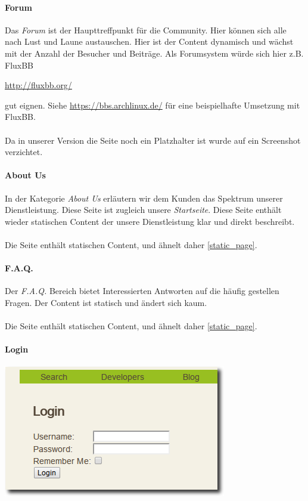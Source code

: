 \paragraph{Forum}
Das \emph{Forum} ist der Haupttreffpunkt für die Community. Hier können sich
alle nach Lust und Laune austauschen. Hier ist der Content dynamisch und wächst
mit der Anzahl der Besucher und Beiträge. Als Forumsystem würde sich hier
z.B. FluxBB 
\begin{center}
    \url{http://fluxbb.org/}
\end{center}
gut eignen. Siehe \url{https://bbs.archlinux.de/} für eine beispielhafte
Umsetzung mit FluxBB.
\\
\\
Da in unserer Version die Seite noch ein Platzhalter ist wurde auf ein Screenshot
verzichtet.


\paragraph{About Us}
In der Kategorie \emph{About Us} erläutern wir dem Kunden das Spektrum unserer
Dienstleistung. Diese Seite ist zugleich unsere \emph{Startseite}. Diese Seite
enthält wieder statischen Content der unsere Dienstleistung klar und direkt
beschreibt.
\\
\\
Die Seite enthält statischen Content, und ähnelt daher \ref{static_page}.

\paragraph{F.A.Q.}
Der \emph{F.A.Q.} Bereich bietet Interessierten Antworten auf die häufig
gestellen Fragen. Der Content ist statisch und ändert sich kaum. 
\\
\\
Die Seite enthält statischen Content, und ähnelt daher \ref{static_page}.

\paragraph{Login}

\begin{center}
\includegraphics[scale=0.5]{../screenshots/login.png}
\end{center}

